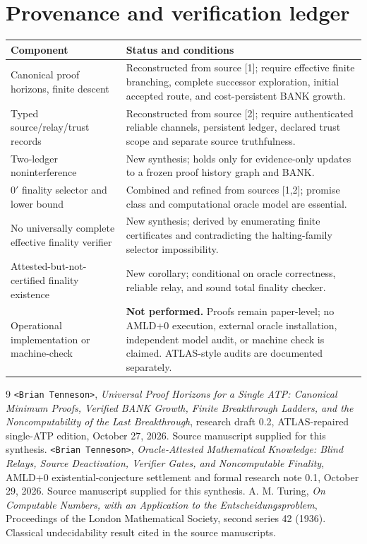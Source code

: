 \documentclass[11pt,letterpaper]{article}
\theoremstyle{definition}
\theoremstyle{remark}
\begin{document}
\section*{Provenance and verification ledger}
\begin{tabularx}{\linewidth}{@{}p{.28\linewidth}X@{}}\toprule
\textbf{Component}&\textbf{Status and conditions}\\\midrule
Canonical proof horizons, finite descent&Reconstructed from source [1]; require effective finite branching, complete successor exploration, initial accepted route, and cost-persistent BANK growth.\\
Typed source/relay/trust records&Reconstructed from source [2]; require authenticated reliable channels, persistent ledger, declared trust scope and separate source truthfulness.\\
Two-ledger noninterference&New synthesis; holds only for evidence-only updates to a frozen proof history graph and BANK.\\
$0'$ finality selector and lower bound&Combined and refined from sources [1,2]; promise class and computational oracle model are essential.\\
No universally complete effective finality verifier&New synthesis; derived by enumerating finite certificates and contradicting the halting-family selector impossibility.\\
Attested-but-not-certified finality existence&New corollary; conditional on oracle correctness, reliable relay, and sound total finality checker.\\
Operational implementation or machine-check&\textbf{Not performed.} Proofs remain paper-level; no AMLD+0 execution, external oracle installation, independent model audit, or machine check is claimed. ATLAS-style audits are documented separately.\\\bottomrule
\end{tabularx}

\begin{thebibliography}{9}
 \texttt{<Brian Tenneson>}, \emph{Universal Proof Horizons for a Single ATP: Canonical Minimum Proofs, Verified BANK Growth, Finite Breakthrough Ladders, and the Noncomputability of the Last Breakthrough}, research draft 0.2, ATLAS-repaired single-ATP edition, October 27, 2026. Source manuscript supplied for this synthesis.
 \texttt{<Brian Tenneson>}, \emph{Oracle-Attested Mathematical Knowledge: Blind Relays, Source Deactivation, Verifier Gates, and Noncomputable Finality}, AMLD+0 existential-conjecture settlement and formal research note 0.1, October 29, 2026. Source manuscript supplied for this synthesis.
 A. M. Turing, \emph{On Computable Numbers, with an Application to the Entscheidungsproblem}, Proceedings of the London Mathematical Society, second series 42 (1936). Classical undecidability result cited in the source manuscripts.
\end{thebibliography}
\end{document}
